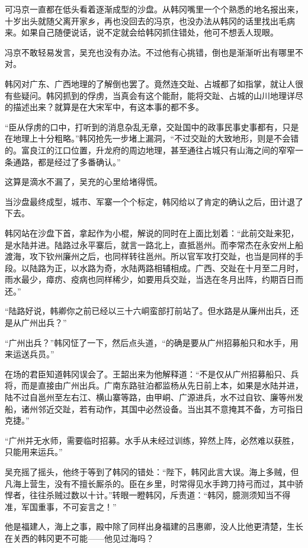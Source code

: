 可冯京一直都在低头看着逐渐成型的沙盘。从韩冈嘴里一个个熟悉的地名报出来，十岁出头就随父离开家乡，再也没回去的冯京，也没办法从韩冈的话里找出毛病来。如果自己随便说话，说不定就会给韩冈抓住错处，他可不想丢人现眼。

冯京不敢轻易发言，吴充也没有办法。不过他有心挑错，倒也是渐渐听出有哪里不对。

韩冈对广东、广西地理的了解倒也罢了。竟然连交趾、占城都了如指掌，就让人很有些疑问。韩冈抓到的俘虏，当真会有这个能耐，能将交趾、占城的山川地理详尽的描述出来？就算是在大宋军中，有这本事的都不多。

“臣从俘虏的口中，打听到的消息杂乱无章，交趾国中的政事民事史事都有，只是在地理上十分粗略。”韩冈抢先一步堵上漏洞，“不过交趾的大致地形，则是不会错的。富良江的江口位置，升龙府的周边地理，甚至通往占城只有山海之间的窄窄一条通路，都是经过了多番确认。”

这算是滴水不漏了，吴充的心里给堵得慌。

当沙盘最终成型，城市、军寨一个个标定，韩冈给以了肯定的确认之后，田计退了下去。

韩冈站在沙盘下首，拿起作为小棍，解说的同时在上面比划着：“此前交趾来犯，是水陆并进。陆路过永平寨后，就言一路北上，直抵邕州。而李常杰在永安州上船渡海，攻下钦州廉州之后，也同样转往邕州。所以官军攻打交趾，也当是同样的手段。以陆路为正，以水路为奇，水陆两路相辅相成。广西、交趾在十月至二月时，雨水最少，瘴疠、疫病也同样稀少，如要用兵交趾，当选在冬月出阵，约期百日而还。”

“陆路好说，韩卿你之前已经以三十六峒蛮部打前站了。但水路是从廉州出兵，还是从广州出兵？”

“广州出兵？”韩冈怔了一下，然后点头道，“的确是要从广州招募船只和水手，用来运送兵员。”

在场的君臣知道韩冈误会了。王韶出来为他解释道：“不是仅从广州招募船只、兵将，而是直接由广州出兵。广南东路驻泊都监杨从先日前上本，如果是水陆并进，陆不过自邕州至左右江、横山寨等路，由甲峒、广源进兵，水不过自钦、廉等州发船，诸州邻近交趾，若有动作，其国中必然设备。当出其不意掩其不备，方可指日克捷。”

“广州并无水师，需要临时招募。水手从未经过训练，猝然上阵，必然难以获胜，只能用来运兵。”

吴充摇了摇头，他终于等到了韩冈的错处：“陛下，韩冈此言大误。海上多贼，但凡海上营生，没有不擅长厮杀的。臣在乡里，时常得见水手跨刀持弓而过，其中骄悍者，往往杀贼过数以十计。”转眼一瞪韩冈，斥责道：“韩冈，臆测须知当不得准，军国重事，不可妄言之！”

他是福建人，海上之事，殿中除了同样出身福建的吕惠卿，没人比他更清楚，生长在关西的韩冈更不可能——他见过海吗？

